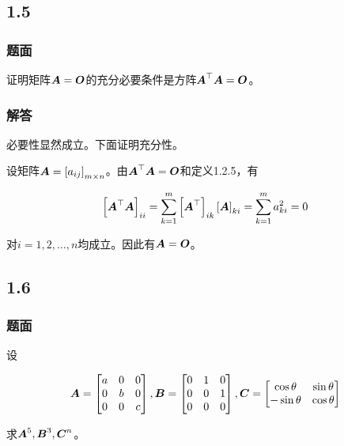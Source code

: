 \documentclass{beamer}
\begin{document}
\subsection*{1.5}

\begin{frame}
\frametitle{题面}

证明矩阵\(\boldsymbol{A}=\boldsymbol{O}\)的充分必要条件是方阵\(\boldsymbol{A}^\top\boldsymbol{A}=\boldsymbol{O}\)。

\end{frame}

\begin{frame}
\frametitle{解答}

    必要性显然成立。下面证明充分性。

    设矩阵\(\boldsymbol{A}=\left[ a_{ij} \right]_{m\times n}\)。由\(\boldsymbol{A}^\top\boldsymbol{A}=\boldsymbol{O}\)和定义1.2.5，有

    \begin{equation*}
        \left[ \boldsymbol{A}^\top\boldsymbol{A} \right]_{ii}=\sum_{k=1}^m\left[ \boldsymbol{A}^\top \right]_{ik}\left[ \boldsymbol{A} \right]_{ki}=\sum_{k=1}^ma_{ki}^2=0
    \end{equation*}

    对\(i=1,2,\dots,n\)均成立。因此有\(\boldsymbol{A}=\boldsymbol{O}\)。

\end{frame}

\subsection*{1.6}

\begin{frame}
    \frametitle{题面}

    设

    \begin{equation*}
        \boldsymbol{A}=\begin{bmatrix}a&0&0\\0&b&0\\0&0&c\end{bmatrix},
        \boldsymbol{B}=\begin{bmatrix}0&1&0\\0&0&1\\0&0&0\end{bmatrix},
        \boldsymbol{C}=\begin{bmatrix}\cos \theta&\sin \theta\\-\sin \theta&\cos \theta\end{bmatrix}
    \end{equation*}

    求\(\boldsymbol{A}^5,\boldsymbol{B}^3,\boldsymbol{C}^n\)。

\end{frame}
\end{document}
